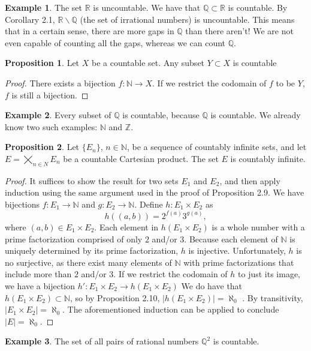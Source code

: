 \documentclass{article}
\newcommand{\N}{\mathbb{N}}
\newcommand{\R}{\mathbb{R}}
\newcommand{\Q}{\mathbb{Q}}
\newcommand{\Z}{\mathbb{Z}}
\theoremstyle{definition}
\newtheorem{proposition}{Proposition}[section]
\newtheorem{example}{Example}[section]
\begin{document}
\begin{example}
	The set $ \R $ is uncountable. We have that $ \Q\subset \R $ is countable. By Corollary 2.1, $ \R\backslash \Q $ (the set of irrational numbers) is uncountable. This means that in a certain sense, there are more gaps in $ \Q $ than there aren't! We are not even capable of counting all the gaps, whereas we can count $ \Q $. 
\end{example}
\begin{proposition}
	Let $ X $ be a countable set. Any subset $ Y\subset X $ is countable
\end{proposition}
\begin{proof}
	There exists a bijection $ f:\N\to X $. If we restrict the codomain of $ f $ to be $ Y $, $ f $ is still a bijection. 
\end{proof}
\begin{example}
	Every subset of $ \Q $ is countable, because $ \Q $ is countable. We already know two such examples: $ \N $ and $ \Z $. 
\end{example}
\begin{proposition}
	Let $ \{E_n\} $, $ n\in\N $, be a sequence of countably infinite sets, and let $ E=\bigtimes\limits_{n\in N}E_n $ be a countable Cartesian product. The set $ E $ is countably infinite. 
\end{proposition}
\begin{proof}
	It suffices to show the result for two sets $ E_1 $ and $ E_2 $, and then apply induction using the same argument used in the proof of Proposition 2.9. We have bijections $ f:E_1\to\N$ and $ g:E_2\to\N $. Define $ h:E_1\times E_2 $ as $$ h((a,b))=2^{f(a)}3^{g(a)},$$ where $ (a,b)\in E_1\times E_2 $. Each element in $ h(E_1\times E_2) $ is a whole number with a prime factorization comprised of only $ 2 $ and/or $ 3 $. Because each element of $ \N $ is uniquely determined by its prime factorization, $ h $ is injective. Unfortunately, $ h $ is no surjective, as there exist many elements of $ \N $ with prime factorizations that include more than $ 2 $ and/or $ 3 $. If we restrict the codomain of $ h $ to just its image, we have a bijection $ h':E_1\times E_2\to  h(E_1\times E_2) $  We do have that $ h(E_1\times E_2)\subset \N  $, so by Proposition 2.10, $ |h(E_1\times E_2)|=\aleph_0 $ . By transitivity, $ |E_1\times E_2|=\aleph_0 $. The aforementioned induction can be applied to conclude $ |E|=\aleph_0 $. 
\end{proof}
\begin{example}
	The set of all pairs of rational numbers $ \Q^2 $ is countable.
\end{example}
\end{document}
